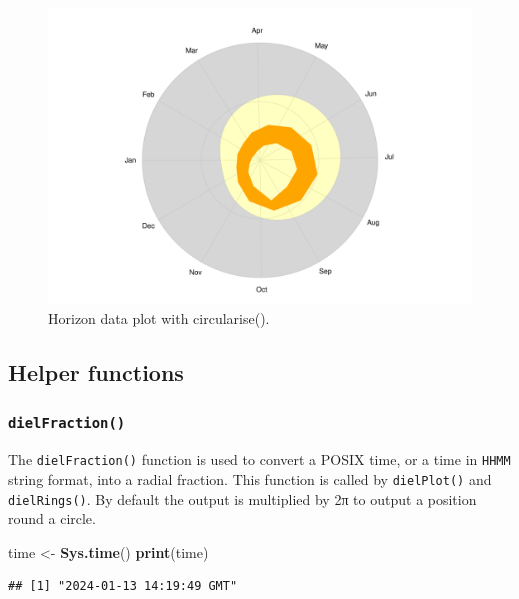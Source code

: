 \documentclass[
]{book}
\newenvironment{Shaded}{\begin{snugshade}}{\end{snugshade}}
\newcommand{\FunctionTok}[1]{\textcolor[rgb]{0.13,0.29,0.53}{\textbf{#1}}}
\newcommand{\NormalTok}[1]{#1}
\newcommand{\OtherTok}[1]{\textcolor[rgb]{0.56,0.35,0.01}{#1}}
\begin{document}
\begin{figure}

{\centering \includegraphics[width=0.9\linewidth]{_main_files/figure-latex/lyme-temp-2-1} 

}

\caption{Horizon data plot with circularise().}\label{fig:lyme-temp-2}
\end{figure}

\hypertarget{helper-functions}{%
\subsection{Helper functions}\label{helper-functions}}

\hypertarget{dielfraction}{%
\subsubsection{\texorpdfstring{\texttt{dielFraction()}}{dielFraction()}}\label{dielfraction}}

The \texttt{dielFraction()} function is used to convert a POSIX time, or a time in \texttt{HHMM} string format, into a radial fraction. This function is called by \texttt{dielPlot()} and \texttt{dielRings()}. By default the output is multiplied by 2π to output a position round a circle.

\begin{Shaded}
\begin{Highlighting}[]
\NormalTok{time }\OtherTok{\textless{}{-}} \FunctionTok{Sys.time}\NormalTok{()}
\FunctionTok{print}\NormalTok{(time)}
\end{Highlighting}
\end{Shaded}

\begin{verbatim}
## [1] "2024-01-13 14:19:49 GMT"
\end{verbatim}
\end{document}
